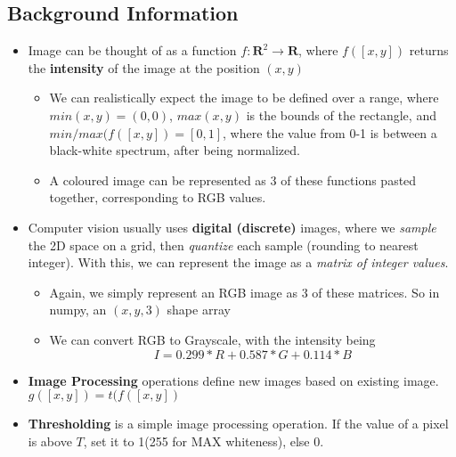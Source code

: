 \documentclass{article}
\begin{document}
\subsection{Background Information}
\begin{itemize}
    \item Image can be thought of as a function $f: \mathbf{R}^2 \rightarrow \mathbf{R}$, where $f([x,y])$ returns the \textbf{intensity} of the image at the position $(x,y)$
    \begin{itemize}
        \item We can realistically expect the image to be defined over a range, where $min(x,y) = (0,0)$, $max(x,y)$ is the bounds of the rectangle, and $min/max(f([x,y]) = [0,1]$, where the value from 0-1 is between a black-white spectrum, after being normalized.
        \item A coloured image can be represented as 3 of these functions pasted together, corresponding to RGB values.
    \end{itemize}
    \item Computer vision usually uses \textbf{digital (discrete)} images, where we \textit{sample} the 2D space on a grid, then \textit{quantize} each sample (rounding to nearest integer). With this, we can represent the image as a \textit{matrix of integer values}.
    \begin{itemize}
        \item Again, we simply represent an RGB image as 3 of these matrices. So in numpy, an $(x,y,3)$ shape array
        \item We can convert RGB to Grayscale, with the intensity being $$I = 0.299 *R+ 0.587*G + 0.114*B$$
    \end{itemize}
    \item \textbf{Image Processing} operations define new images based on existing image. $g([x,y]) = t(f([x,y])$
    \item \textbf{Thresholding} is a simple image processing operation. If the value of a pixel is above $T$, set it to 1(255 for MAX whiteness), else $0$. 
\end{itemize}
\end{document}
